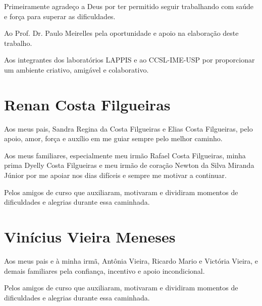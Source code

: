 \begin{agradecimentos}
Primeiramente agradeço a Deus por ter permitido seguir trabalhando com saúde e força para superar as dificuldades.

Ao Prof. Dr. Paulo Meirelles pela oportunidade e apoio na elaboração deste trabalho.

Aos integrantes dos laboratórios LAPPIS e ao CCSL-IME-USP por proporcionar um ambiente criativo, amigável e colaborativo.

\section{Renan Costa Filgueiras}
Aos meus pais, Sandra Regina da Costa Filgueiras e Elias Costa Filgueiras, pelo apoio, amor, força e auxílio em me guiar sempre pelo melhor caminho.

Aos meus familiares, especialmente meu irmão Rafael Costa Filgueiras, minha prima Dyelly Costa Filgueiras e meu irmão de coração Newton da Silva Miranda Júnior por me apoiar nos dias difíceis e sempre me motivar a continuar.

Pelos amigos de curso que auxiliaram, motivaram e dividiram momentos de dificuldades e alegrias durante essa caminhada.

\section{Vinícius Vieira Meneses}
Aos meus pais e à minha irmã, Antônia Vieira, Ricardo Mario e Victória Vieira, e demais familiares pela confiança, incentivo e apoio incondicional.

Pelos amigos de curso que auxiliaram, motivaram e dividiram momentos de dificuldades e alegrias durante essa caminhada.
\end{agradecimentos} 